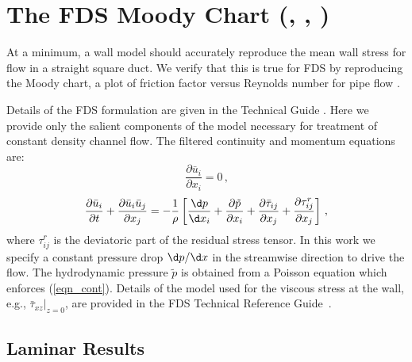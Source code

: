 \documentclass[11pt]{book}
\begin{document}
\section{The FDS Moody Chart (\texorpdfstring{}{poiseuille}, \texorpdfstring{}{smoothwall}, \texorpdfstring{}{z0})}
\label{fds_moody_chart}

At a minimum, a wall model should accurately reproduce the mean wall stress for flow in a straight square duct.  We verify that this is true for FDS by reproducing the Moody chart, a plot of friction factor versus Reynolds number for pipe flow \cite{Moody:1944}.

Details of the FDS formulation are given in the Technical Guide \cite{FDS_Math_Guide}.  Here we provide only the salient components of the model necessary for treatment of constant density channel flow. The filtered continuity and momentum equations are:
\begin{equation}
\label{eqn_cont}
\frac{\partial \bar{u}_i}{\partial x_i} = 0 \,\mbox{,}
\end{equation}
\begin{equation}
\label{eqn_mom1}
\frac{\partial \bar{u}_i}{\partial t} + \frac{\partial \bar{u}_i \bar{u}_j}{\partial x_j} = -\frac{1}{\rho} \left[ \frac{\d p}{\d x_i} + \frac{\partial \tilde{p}}{\partial x_i} + \frac{\partial \bar{\tau}_{ij}}{\partial x_j} + \frac{\partial \tau_{ij}^{r}}{\partial x_j} \right]\,\mbox{,}
\end{equation}
where $\tau_{ij}^{r}$ is the deviatoric part of the residual stress tensor.  In this work we specify a constant pressure drop $\d p/\d x$ in the streamwise direction to drive the flow.  The hydrodynamic pressure $\tilde{p}$ is obtained from a Poisson equation which enforces (\ref{eqn_cont}). Details of the model used for the viscous stress at the wall, e.g., $\bar{\tau}_{xz}|_{z=0}$, are provided in the FDS Technical Reference Guide~\cite{FDS_Tech_Guide}.

\subsection{Laminar Results}
\label{laminar}
\end{document}
